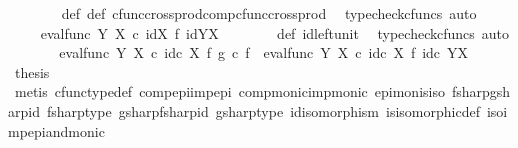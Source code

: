 \begin{isabellebody}
\ \ \ \ \ \ \isamarkupfalse%
\ {\isasymphi}{\isacharunderscore}{\kern0pt}def\ {\isasympsi}{\isacharunderscore}{\kern0pt}def\ cfunc{\isacharunderscore}{\kern0pt}cross{\isacharunderscore}{\kern0pt}prod{\isacharunderscore}{\kern0pt}comp{\isacharunderscore}{\kern0pt}cfunc{\isacharunderscore}{\kern0pt}cross{\isacharunderscore}{\kern0pt}prod\ \isamarkupfalse%
\ {\isacharparenleft}{\kern0pt}typecheck{\isacharunderscore}{\kern0pt}cfuncs{\isacharcomma}{\kern0pt}\ auto{\isacharparenright}{\kern0pt}\isanewline
\ \ \ \ \isamarkupfalse%
\ \isamarkupfalse%
\ {\isachardoublequoteopen}{\isachardot}{\kern0pt}{\isachardot}{\kern0pt}{\isachardot}{\kern0pt}\ {\isacharequal}{\kern0pt}\ eval{\isacharunderscore}{\kern0pt}func\ Y\ X\ {\isasymcirc}\isactrlsub c\ id{\isacharparenleft}{\kern0pt}X{\isacharparenright}{\kern0pt}\ {\isasymtimes}\isactrlsub f\ id{\isacharparenleft}{\kern0pt}Y\isactrlbsup X\isactrlesup {\isacharparenright}{\kern0pt}{\isachardoublequoteclose}\isanewline
\ \ \ \ \ \ \isamarkupfalse%
\ {\isasympsi}{\isacharunderscore}{\kern0pt}def\ id{\isacharunderscore}{\kern0pt}left{\isacharunderscore}{\kern0pt}unit{}\ \isamarkupfalse%
\ {\isacharparenleft}{\kern0pt}typecheck{\isacharunderscore}{\kern0pt}cfuncs{\isacharcomma}{\kern0pt}\ auto{\isacharparenright}{\kern0pt}\isanewline
\ \ \ \ \isamarkupfalse%
\ \isamarkupfalse%
\ {\isachardoublequoteopen}eval{\isacharunderscore}{\kern0pt}func\ Y\ X\ {\isasymcirc}\isactrlsub c\ id\isactrlsub c\ X\ {\isasymtimes}\isactrlsub f\ g\isactrlsup {\isasymsharp}\ {\isasymcirc}\isactrlsub c\ f\isactrlsup {\isasymsharp}\ {\isacharequal}{\kern0pt}\ eval{\isacharunderscore}{\kern0pt}func\ Y\ X\ {\isasymcirc}\isactrlsub c\ id\isactrlsub c\ X\ {\isasymtimes}\isactrlsub f\ id\isactrlsub c\ {\isacharparenleft}{\kern0pt}Y\isactrlbsup X\isactrlesup {\isacharparenright}{\kern0pt}{\isachardoublequoteclose}\isacommand{{\isachardot}{\kern0pt}}\isamarkupfalse%
\isanewline
\ \ \isamarkupfalse%
\isanewline
\ \ \isamarkupfalse%
\ {\isacharquery}{\kern0pt}thesis\isanewline
\ \ \ \ \isamarkupfalse%
\ {\isacharparenleft}{\kern0pt}metis\ cfunc{\isacharunderscore}{\kern0pt}type{\isacharunderscore}{\kern0pt}def\ comp{\isacharunderscore}{\kern0pt}epi{\isacharunderscore}{\kern0pt}imp{\isacharunderscore}{\kern0pt}epi\ comp{\isacharunderscore}{\kern0pt}monic{\isacharunderscore}{\kern0pt}imp{\isacharunderscore}{\kern0pt}monic\ epi{\isacharunderscore}{\kern0pt}mon{\isacharunderscore}{\kern0pt}is{\isacharunderscore}{\kern0pt}iso\ fsharp{\isacharunderscore}{\kern0pt}gsharp{\isacharunderscore}{\kern0pt}id\ fsharp{\isacharunderscore}{\kern0pt}type\ gsharp{\isacharunderscore}{\kern0pt}fsharp{\isacharunderscore}{\kern0pt}id\ gsharp{\isacharunderscore}{\kern0pt}type\ id{\isacharunderscore}{\kern0pt}isomorphism\ is{\isacharunderscore}{\kern0pt}isomorphic{\isacharunderscore}{\kern0pt}def\ iso{\isacharunderscore}{\kern0pt}imp{\isacharunderscore}{\kern0pt}epi{\isacharunderscore}{\kern0pt}and{\isacharunderscore}{\kern0pt}monic{\isacharparenright}{\kern0pt}\isanewline

\end{isabellebody}
